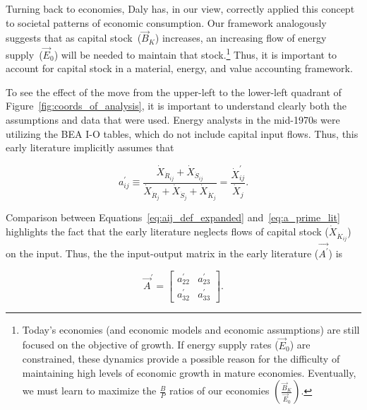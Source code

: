 Turning back to economies,
Daly has, in our view,
correctly applied this concept to societal patterns
of economic consumption.\cite{Daly1995}
Our framework analogously suggests that
as capital stock~($\vec{B}_{K}$) increases,
an increasing flow of energy supply~($\vec{E}_{0}$)
will be needed to maintain that stock.\footnote{Today's economies 
	(and economic models and economic assumptions) are still focused
	on the objective of growth.
	If energy supply rates ($\vec{E}_{0}$) are constrained,
	these dynamics provide a possible reason for the difficulty
	of maintaining high levels of economic growth
	in mature economies.
	Eventually,
	we must learn to maximize the $\frac{B}{P}$
	ratios of our economies 
	$\left(\frac{\vec{B}_{K}}{\vec{E}_{0}}\right)$.}
Thus, it is important to account for capital stock in 
a material, energy, and value accounting framework.

To see the effect of the move from the upper-left to the lower-left
quadrant of Figure~\ref{fig:coords_of_analysis}, 
it is important to understand clearly both the assumptions and data that were used.
Energy analysts in the mid-1970s were utilizing the BEA I-O tables,
which do not include capital input flows. 
Thus, this early literature implicitly assumes that 

\begin{equation} \label{eq:a_prime_lit}
	a_{ij}^{'} 
	\equiv \frac{\dot{X}_{\dot{R}_{ij}} + \dot{X}_{\dot{S}_{ij}}}
				{\dot{X}_{\dot{R}_{j}} + \dot{X}_{\dot{S}_{j}} + \dot{X}_{\dot{K}_{j}}}
	= \frac{\dot{X}_{ij}^{'}}{\dot{X}_{j}}.
\end{equation}

\noindent{}Comparison between Equations~\ref{eq:aij_def_expanded}
and~\ref{eq:a_prime_lit}
highlights the fact that the early literature neglects flows of capital stock
($\dot{X}_{\dot{K}_{ij}}$) on the input.
Thus, the the input-output matrix in the early literature
($\vec{A^{'}}$) is

\begin{equation} \label{eq:A_matrix_def_literature}
	\vec{A}^{'} 
	=
	\begin{bmatrix}
		a_{22}^{'} & a_{23}^{'}	\\
		a_{32}^{'} & a_{33}^{'}	
	\end{bmatrix}.
\end{equation}

